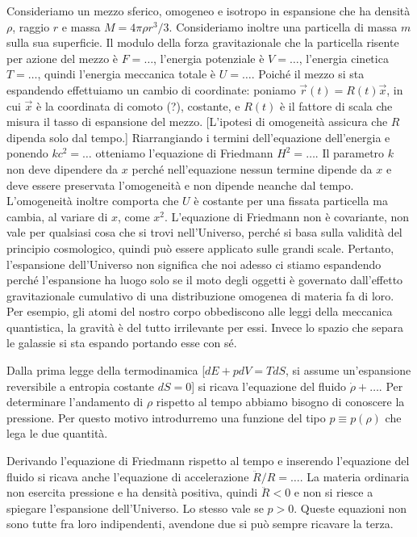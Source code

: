 \documentclass[10pt,a4paper,fleqn,draft]{article}
\begin{document}
Consideriamo un mezzo sferico, omogeneo e isotropo in espansione che ha densità
$\rho$, raggio $r$ e massa $M = 4\pi\rho r^3/3$. Consideriamo inoltre una
particella di massa $m$ sulla sua superficie. Il modulo della forza
gravitazionale che la particella risente per azione del mezzo è $F = \dots$,
l'energia potenziale è $V = \dots$, l'energia cinetica $T = \dots$, quindi
l'energia meccanica totale è $U = \dots$.  Poiché il mezzo si sta espandendo
effettuiamo un cambio di coordinate: poniamo $\vec{r}(t) = R(t) \vec{x}$, in cui
$\vec{x}$ è la coordinata di comoto (?), costante, e $R(t)$ è il fattore di
scala che misura il tasso di espansione del mezzo. [L'ipotesi di omogeneità
assicura che $R$ dipenda solo dal tempo.]  Riarrangiando i termini
dell'equazione dell'energia e ponendo $kc^2 = \dots$ otteniamo l'equazione di
Friedmann $H^2 = \dots$. Il parametro $k$ non deve dipendere da $x$ perché
nell'equazione nessun termine dipende da $x$ e deve essere preservata
l'omogeneità e non dipende neanche dal tempo. L'omogeneità inoltre comporta che
$U$ è costante per una fissata particella ma cambia, al variare di $x$, come
$x^2$. L'equazione di Friedmann non è covariante, non vale per qualsiasi cosa
che si trovi nell'Universo, perché si basa sulla validità del principio
cosmologico, quindi può essere applicato sulle grandi scale. Pertanto,
l'espansione dell'Universo non significa che noi adesso ci stiamo espandendo
perché l'espansione ha luogo solo se il moto degli oggetti è governato
dall'effetto gravitazionale cumulativo di una distribuzione omogenea di materia
fa di loro. Per esempio, gli atomi del nostro corpo obbediscono alle leggi della
meccanica quantistica, la gravità è del tutto irrilevante per essi. Invece lo
spazio che separa le galassie si sta espando portando esse con sé.

Dalla prima legge della termodinamica [$dE + pdV = TdS$, si assume un'espansione
reversibile a entropia costante $dS = 0$] si ricava l'equazione del fluido
$\dot{\rho} + \dots$. Per determinare l'andamento di $\rho$ rispetto al tempo
abbiamo bisogno di conoscere la pressione. Per questo motivo introdurremo una
funzione del tipo $p \equiv p(\rho)$ che lega le due quantità.

Derivando l'equazione di Friedmann rispetto al tempo e inserendo l'equazione del
fluido si ricava anche l'equazione di accelerazione $\ddot{R}/R = \dots$. La
materia ordinaria non esercita pressione e ha densità positiva, quindi
$\ddot{R}<0$ e non si riesce a spiegare l'espansione dell'Universo. Lo stesso
vale se $p>0$. Queste equazioni non sono tutte fra loro indipendenti, avendone
due si può sempre ricavare la terza.
\end{document}

